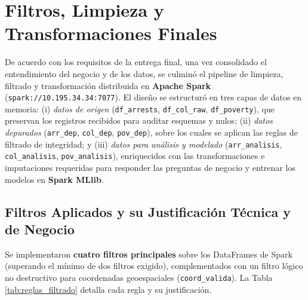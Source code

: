 \documentclass[11pt,a4paper]{article}
\begin{document}


\section{Filtros, Limpieza y Transformaciones Finales}
\label{sec:limpieza_transformacion}

De acuerdo con los requisitos de la entrega final, una vez consolidado el entendimiento del negocio y de los datos, se culminó el pipeline de limpieza, filtrado y transformación distribuida en \textbf{Apache Spark} (\texttt{spark://10.195.34.34:7077}). El diseño se estructuró en tres capas de datos en memoria: (i) \textit{datos de origen} (\texttt{df\_arrests}, \texttt{df\_col\_raw}, \texttt{df\_poverty}), que preservan los registros recibidos para auditar esquemas y nulos; (ii) \textit{datos depurados} (\texttt{arr\_dep}, \texttt{col\_dep}, \texttt{pov\_dep}), sobre los cuales se aplican las reglas de filtrado de integridad; y (iii) \textit{datos para análisis y modelado} (\texttt{arr\_analisis}, \texttt{col\_analisis}, \texttt{pov\_analisis}), enriquecidos con las transformaciones e imputaciones requeridas para responder las preguntas de negocio y entrenar los modelos en \textbf{Spark MLlib}.

\subsection{Filtros Aplicados y su Justificación Técnica y de Negocio}
\label{subsec:filtros_inconsistentes}

Se implementaron \textbf{cuatro filtros principales} sobre los DataFrames de Spark (superando el mínimo de dos filtros exigido), complementados con un filtro lógico no destructivo para coordenadas geoespaciales (\texttt{coord\_valida}). La Tabla \ref{tab:reglas_filtrado} detalla cada regla y su justificación.
\end{document}
